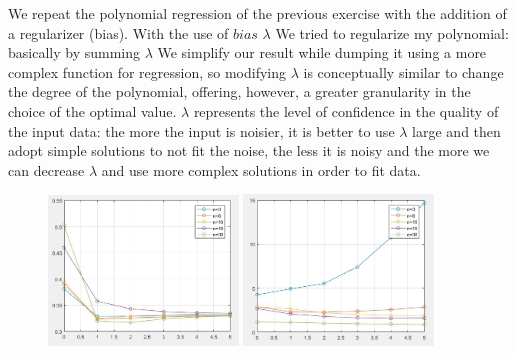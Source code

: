 \begin{figure}[h]
\end{figure}
We repeat the polynomial regression of the previous exercise with the addition of a regularizer (bias). With the use of $bias$ $\lambda$ We tried to regularize my polynomial: basically by summing $\lambda$ We simplify our result while dumping it using a more complex function for regression, so modifying $\lambda$ is conceptually similar to change the degree of the polynomial, offering, however, a greater granularity in the choice of the optimal value.
$\lambda$ represents the level of confidence in the quality of the input data: the more the input is noisier, it is better to use $\lambda$ large and then adopt simple solutions to not fit the noise, the less it is noisy and the more we can decrease $\lambda$ and use more complex solutions in order to fit data.

\begin{figure}[!tbp]

	\centering
	\includegraphics[width=0.45\textwidth]{pl100s10.png}
	\hfill
	\includegraphics[width=0.45\textwidth]{pl0001s10.png}
\end{figure}
\begin{figure}[!tbp]
	\centering
	\hfill
	
\end{figure}


